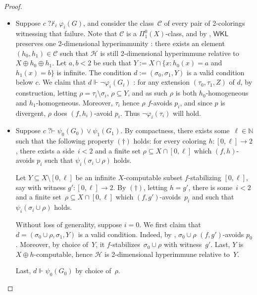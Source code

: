 \documentclass{article}
\def\C{\mathcal{C}}
\def\Hc{\mathcal{H}}
\newcommand{\qvdash}{\operatorname{{?}{\vdash}}}
\newcommand{\nqvdash}{\operatorname{{?}{\nvdash}}}
\newcommand{\WKL}[0]{\mathsf{WKL}}
\newcommand{\NN}[0]{\mathbb{N}}
\def\NN{\mathbb{N}}
\def\C{\mathcal{C}}
\def\Hc{\mathcal{H}}
\numberwithin{theorem}{section}
\theoremstyle{definition}
\begin{document}
\begin{proof}
\begin{itemize}
    Last, $d \vdash \varphi_0(G_0)$ by choice of~$\rho$.

    \item 
    Suppose $c \nqvdash_i \varphi_i(G)$, and consider the class~$\C$ of every pair of 2-colorings witnessing that failure. Note that $\C$ is a $\Pi_1^0(X)$-class, and by \cite[Corollary 2.7]{liu2022reverse}, $\WKL$ preserves one 2-dimensional hyperimmunity : there exists an element $(h_0,h_1) \in \C$ such that $\Hc$ is still 2-dimensional hyperimmune relative to $X \oplus h_0 \oplus h_1$. Let $a,b<2$ be such that $Y := X \cap \{ x : h_0(x)=a$ and $h_1(x)=b \}$ is infinite. The condition $d := (\sigma_0,\sigma_1,Y)$ is a valid condition below $c$. We claim that $d \Vdash \neg \varphi_i(G_i)$ : for any extension $(\tau_0,\tau_1,Z)$ of $d$, by construction, letting $\rho = \tau_i \setminus \sigma_i$,  $\rho \subseteq Y$, and as such $\rho$ is both $h_0$-homogeneous and $h_1$-homogeneous. Moreover, $\tau_i$ hence $\rho$ $f$-avoids $p_i$, and since $p$ is divergent, $\rho$ does $(f,h_i)$-avoid $p_i$. Thus $\neg \varphi_i(\tau_i)$ will hold.



    \item Suppose $c \qvdash \psi_0(G_0) \lor \psi_1(G_1)$. By compactness, there exists some~$\ell \in \NN$ such that the following property $(\dagger)$ holds: for every coloring $h : [0, \ell] \to 2$, there exists a side~$i < 2$ and a finite set $\rho \subseteq X \cap [0, \ell]$ which $(f, h)$-avoids $p_i$ such that $\psi_i(\sigma_i \cup \rho)$ holds.

    Let $Y \subseteq X \setminus [0, \ell]$ be an infinite $X$-computable subset $f$-stabilizing $[0, \ell]$, say with witness $g' : [0, \ell] \to 2$. By $(\dagger)$, letting $h = g'$, there is some~$i < 2$ and a finite set~$\rho \subseteq X \cap [0, \ell]$ which $(f, g')$-avoids~$p_i$ and such that $\psi_i(\sigma_i \cup \rho)$ holds.

    Without loss of generality, suppose $i=0$. We first claim that $d = (\sigma_0 \cup \rho, \sigma_1, Y)$ is a valid condition. Indeed, by , $\sigma_0 \cup \rho$ $(f, g')$-avoids $p_0$. Moreover, by choice of~$Y$, it $f$-stabilizes~$\sigma_0 \cup \rho$ with witness~$g'$. Last, $Y$ is $X \oplus h$-computable, hence $\Hc$ is 2-dimensional hyperimmune relative to~$Y$.

    Last, $d \Vdash \psi_0(G_0)$ by choice of~$\rho$.
\end{itemize}

   
\end{proof}
\end{document}
